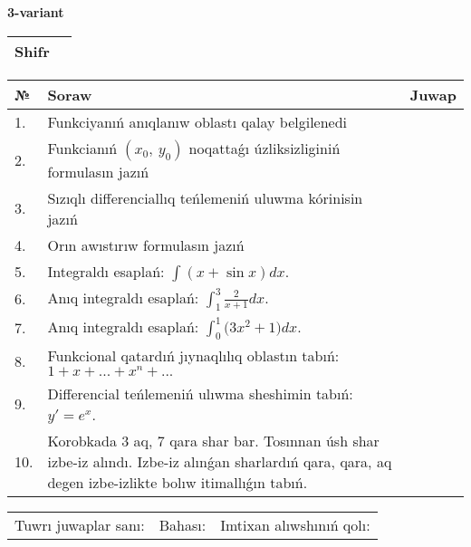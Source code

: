 \documentclass{article}
\begin{document}
  \egroup
  
  \newpage
  
  
  \textbf{3-variant}\\
  
  \bgroup
  \def\arraystretch{1.6} %
  
  \begin{tabular}{|m{5.7cm}|m{9.5cm}|}
  \hline
  Shifr & \\
  \hline
  \end{tabular}
  
  \vspace{1cm}
  
  \begin{tabular}{|m{0.7cm}|m{10cm}|m{4cm}|}
  \hline
  № & Soraw & Juwap \\
  \hline
  1. & Funkciyanıń anıqlanıw oblastı qalay belgilenedi &  \\
  \hline
  2. & Funkcianıń \((x_{0},\ y_{0})\) noqattaǵı úzliksizliginiń formulasın jazıń &  \\
  \hline
  3. & Sızıqlı differenciallıq teńlemeniń uluwma kórinisin jazıń &  \\
  \hline
  4. & Orın awıstırıw formulasın jazıń &  \\
  \hline
  5. & Integraldı esaplań: \(\int{(x + \sin x)dx}\). &  \\
  \hline
  6. & Anıq integraldı esaplań: \(\int_{1}^{3}\frac{2}{x + 1}dx\). &  \\
  \hline
  7. & Anıq integraldı esaplań: \(\int_{0}^{1}{(3x^2 } + 1)dx\). &  \\
  \hline
  8. & Funkcional qatardıń jıynaqlılıq oblastın tabıń:\(1 + x + ... + x^{n} + ...\) &  \\
  \hline
  9. & Differencial teńlemeniń ulıwma sheshimin tabıń: \(y' = e^{x}\). &  \\
  \hline
  10. & Korobkada 3 aq, 7 qara shar bar. Tosınnan úsh shar izbe-iz alındı. Izbe-iz alınǵan sharlardıń qara, qara, aq degen izbe-izlikte bolıw itimallıǵın tabıń. &  \\
  \hline
  \end{tabular}
  
  \vspace{1cm}
  
  \begin{tabular}{lll}
  Tuwrı juwaplar sanı: \underline{\hspace{1.5cm}} & 
  Bahası: \underline{\hspace{1.5cm}} & 
  Imtixan alıwshınıń qolı: \underline{\hspace{2cm}} \\
  \end{tabular}
  
\end{document}
